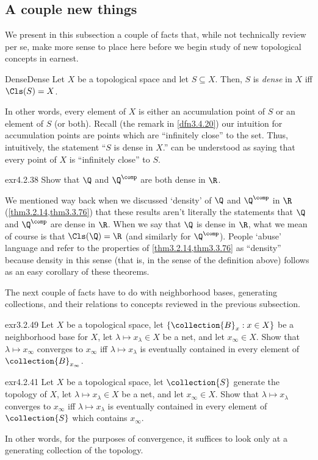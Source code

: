 \subsection{A couple new things}

We present in this subsection a couple of facts that, while not technically review per se, make more sense to place here before we begin study of new topological concepts in earnest.

\begin{dfn}{Dense}{Dense}
Let $X$ be a topological space and let $S\subseteq X$.  Then, $S$ is \emph{dense} in $X$ iff $\Cls (S)=X$.
\begin{rmk}
In other words, every element of $X$ is either an accumulation point of $S$ or an element of $S$ (or both).  Recall (the remark in \cref{dfn3.4.20}) our intuition for accumulation points are points which are ``infinitely close'' to the set.  Thus, intuitively, the statement ``$S$ is dense in $X$.'' can be understood as saying that every point of $X$ is ``infinitely close'' to $S$.
\end{rmk}
\end{dfn}
\begin{exr}{}{exr4.2.38}
Show that $\Q$ and $\Q ^{\comp}$ are both dense in $\R$.
\begin{rmk}
We mentioned way back when we discussed `density' of $\Q$ and $\Q ^{\comp}$ in $\R$ (\cref{thm3.2.14,thm3.3.76}) that these results aren't literally the statements that $\Q$ and $\Q ^{\comp}$ are dense in $\R$.  When we say that $\Q$ is dense in $\R$, what we mean of course is that $\Cls (\Q )=\R$ (and similarly for $\Q ^{\comp}$).  People `abuse' language and refer to the properties of \cref{thm3.2.14,thm3.3.76} as ``density'' because density in this sense (that is, in the sense of the definition above) follows as an easy corollary of these theorems.
\end{rmk}
\end{exr}

The next couple of facts have to do with neighborhood bases, generating collections, and their relations to concepts reviewed in the previous subsection.
\begin{exr}{}{exr3.2.49}
Let $X$ be a topological space, let $\left\{ \collection{B}_x:x\in X\right\}$ be a neighborhood base for $X$, let $\lambda \mapsto x_{\lambda}\in X$ be a net, and let $x_{\infty}\in X$.  Show that $\lambda \mapsto x_{\infty}$ converges to $x_{\infty}$ iff $\lambda \mapsto x_{\lambda}$ is eventually contained in every element of $\collection{B}_{x_{\infty}}$.
\end{exr}
\begin{exr}{}{exr4.2.41}
Let $X$ be a topological space, let $\collection{S}$ generate the topology of $X$, let $\lambda \mapsto x_\lambda \in X$ be a net, and let $x_\infty \in X$.  Show that $\lambda \mapsto x_\lambda$ converges to $x_\infty$ iff $\lambda \mapsto x_\lambda$ is eventually contained in every element of $\collection{S}$ which contains $x_\infty$.
\begin{rmk}
In other words, for the purposes of convergence, it suffices to look only at a generating collection of the topology.
\end{rmk}
\end{exr}

